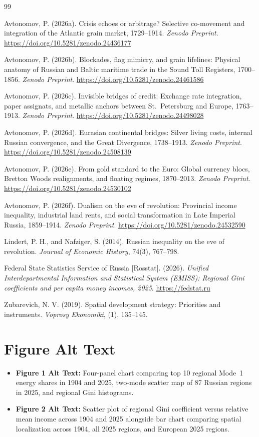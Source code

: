 \documentclass[11pt,a4paper]{article}
\begin{document}
\begin{thebibliography}{99}

Avtonomov, P. (2026a). Crisis echoes or arbitrage? Selective co-movement and integration of the Atlantic grain market, 1729--1914. \emph{Zenodo Preprint}. \url{https://doi.org/10.5281/zenodo.24436177}

Avtonomov, P. (2026b). Blockades, flag mimicry, and grain lifelines: Physical anatomy of Russian and Baltic maritime trade in the Sound Toll Registers, 1700--1856. \emph{Zenodo Preprint}. \url{https://doi.org/10.5281/zenodo.24461586}

Avtonomov, P. (2026c). Invisible bridges of credit: Exchange rate integration, paper assignats, and metallic anchors between St.~Petersburg and Europe, 1763--1913. \emph{Zenodo Preprint}. \url{https://doi.org/10.5281/zenodo.24498028}

Avtonomov, P. (2026d). Eurasian continental bridges: Silver living costs, internal Russian convergence, and the Great Divergence, 1738--1913. \emph{Zenodo Preprint}. \url{https://doi.org/10.5281/zenodo.24508139}

Avtonomov, P. (2026e). From gold standard to the Euro: Global currency blocs, Bretton Woods realignments, and floating regimes, 1870--2013. \emph{Zenodo Preprint}. \url{https://doi.org/10.5281/zenodo.24530102}

Avtonomov, P. (2026f). Dualism on the eve of revolution: Provincial income inequality, industrial land rents, and social transformation in Late Imperial Russia, 1859--1914. \emph{Zenodo Preprint}. \url{https://doi.org/10.5281/zenodo.24532590}

Lindert, P. H., and Nafziger, S. (2014). Russian inequality on the eve of revolution. \emph{Journal of Economic History}, 74(3), 767--798.

Federal State Statistics Service of Russia [Rosstat]. (2026). \emph{Unified Interdepartmental Information and Statistical System (EMISS): Regional Gini coefficients and per capita money incomes, 2025}. \url{https://fedstat.ru}

Zubarevich, N. V. (2019). Spatial development strategy: Priorities and instruments. \emph{Voprosy Ekonomiki}, (1), 135--145.
\end{thebibliography}
\section*{Figure Alt Text}
\begin{itemize}
\item \textbf{Figure 1 Alt Text:} Four-panel chart comparing top 10 regional Mode~1 energy shares in 1904 and 2025, two-mode scatter map of 87 Russian regions in 2025, and regional Gini histograms.
\item \textbf{Figure 2 Alt Text:} Scatter plot of regional Gini coefficient versus relative mean income across 1904 and 2025 alongside bar chart comparing spatial localization across 1904, all 2025 regions, and European 2025 regions.
\end{itemize}
\end{document}
